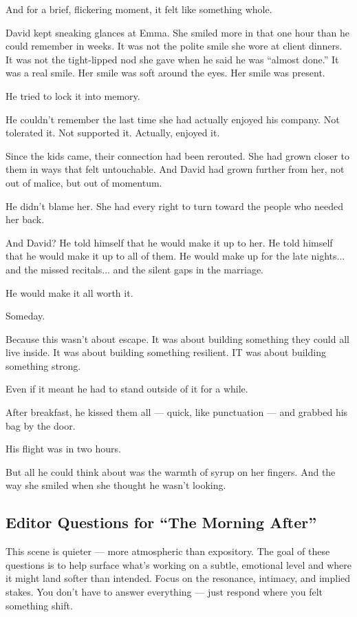 And for a brief, flickering moment, it felt like something whole.

David kept sneaking glances at Emma. 
She smiled more in that one hour than he could remember in weeks. 
It was not the polite smile she wore at client dinners.
It was not the tight-lipped nod she gave when he said he was ``almost done.''
It was a real smile. Her smile was soft around the eyes. Her smile was present.

He tried to lock it into memory.

He couldn’t remember the last time she had actually enjoyed his company. Not tolerated it. Not supported it. 
Actually, enjoyed it.

Since the kids came, their connection had been rerouted. 
She had grown closer to them in ways that felt untouchable. 
And David had grown further from her, not out of malice, but out of momentum.

He didn’t blame her. 
She had every right to turn toward the people who needed her back.

And David? 
He told himself that he would make it up to her. 
He told himself that he would make it up to all of them.
He would make up for the late nights... and the missed recitals... and the silent gaps in the marriage.

He would make it all worth it.

Someday.

Because this wasn’t about escape. 
It was about building something they could all live inside.
It was about building something resilient. 
IT was about building something strong.

Even if it meant he had to stand outside of it for a while.

After breakfast, he kissed them all --- quick, like punctuation --- and grabbed his bag by the door.

His flight was in two hours.

But all he could think about was the warmth of syrup on her fingers.
And the way she smiled when she thought he wasn’t looking.


\subsection*{Editor Questions for ``The Morning After''}

This scene is quieter — more atmospheric than expository. The goal of these questions is to help surface what’s working on a subtle, emotional level and where it might land softer than intended. Focus on the resonance, intimacy, and implied stakes. You don’t have to answer everything — just respond where you felt something shift.

